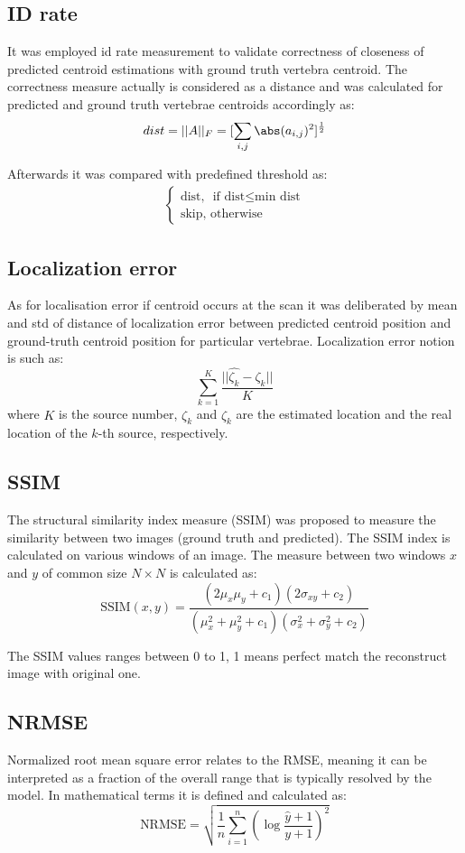 \subsection{ID rate}
It was employed id rate measurement to validate correctness of closeness of predicted centroid estimations with ground truth vertebra centroid. The correctness measure actually is considered as a distance and was calculated for predicted and ground truth vertebrae centroids accordingly as:
\[ dist = ||A||_F = [\sum_{i,j} \abs(a_{i,j})^2]^{\frac{1}{2}} \]

Afterwards it was compared with predefined threshold as:
\begin{align*}
\begin{cases}
\text{dist, } \mbox{ if } \text{dist} \leq \text{min dist} \\ 
\text{skip}, \mbox{ otherwise} \end{cases}
\end{align*}

\subsection{Localization error}
As for localisation error if centroid occurs at the scan it was deliberated by mean and std of distance of localization error between predicted centroid position and ground-truth centroid position for particular vertebrae. Localization error notion is such as:
\[ \sum_{k=1}^K \frac{||\hat{\zeta_k} - \zeta_k || }{K} \]
where $K$ is the source number, $\hat{\zeta_k}$ and $\zeta_k$ are the estimated location and the real location of the $k$-th source, respectively.

\subsection{SSIM}
The structural similarity index measure (SSIM) was proposed to measure the similarity between two images (ground truth and predicted). The SSIM index is calculated on various windows of an image. The measure between two windows  $x$ and $y$ of common size $N \times N$ is calculated as: 
\[ \text{SSIM}(x,y) = \frac{(2\mu_x\mu_y + c_1)(2\sigma_{xy}+c_2)}{(\mu_x^2+\mu_y^2+c_1)(\sigma_x^2+\sigma_y^2+c_2)}\]

The SSIM values ranges between 0 to 1, 1 means perfect match the reconstruct image with original one.

\subsection{NRMSE}
Normalized root mean square error relates to the RMSE, meaning it can be interpreted as a fraction of the overall range that is typically resolved by the model. In mathematical terms it is defined and calculated as:
\[ \text{NRMSE} = \sqrt{\frac{1}{n} \sum_{i=1}^n\left(\log \frac{\hat{y}+1}{y+1}\right)^2} \]


